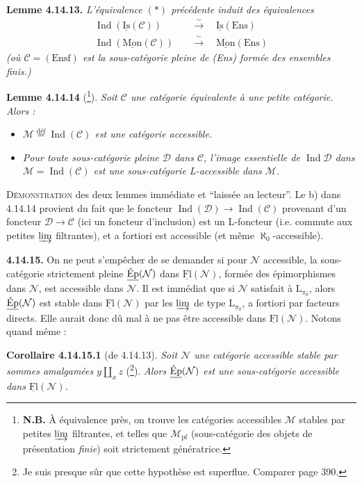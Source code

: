 \documentclass[11pt]{article}
\newcommand{\msp}[1]{\marginpar{\footnotesize [#1]}}
\DeclareMathOperator{\Ind}{Ind}
\newcommand{\defeq}{\overset{\text{déf}}{=}}
\newcommand{\uFl}{\underline{\mathrm{Fl}}}
\newcommand{\uIs}{\underline{\mathrm{Is}}}
\newcommand{\uMon}{\underline{\mathrm{Mon}}}
\newcommand{\uEp}{\underline{\textup{Ép}}}
\newcommand{\Ens}{\mathrm{Ens}}
\begin{document}
\textbf{Lemme 4.14.13.} \textit{L'équivalence $(*)$ précédente induit des équivalences}
\[
\begin{aligned}
\Ind(\uIs(\mathcal{C})) \quad &\xrightarrow{\ \sim\ } \quad \uIs(\Ens) \\
\Ind(\uMon(\mathcal{C})) \quad &\xrightarrow{\ \sim\ } \quad \uMon(\Ens)
\end{aligned}
\]
\textit{(où $\mathcal{C} = (\mathrm{Ensf})$ est la sous-catégorie pleine de \textup{(Ens)} formée des ensembles \textup{finis}.)}

\textbf{Lemme 4.14.14} (\footnote[166]{\textbf{N.B.} À équivalence près, on trouve les catégories accessibles $\mathcal{M}$ stables par petites $\varinjlim$ filtrantes, et telles que $\mathcal{M}_{\mathrm{pf}}$ (sous-catégorie des objets de présentation \textit{finie}) soit strictement génératrice.}). \textit{Soit $\mathcal{C}$ une catégorie équivalente à une petite catégorie. Alors :}
\begin{itemize}[nosep]
\item[\textit{a)}] \textit{$\mathcal{M} \defeq \Ind(\mathcal{C})$ est une catégorie accessible.}
\item[\textit{b)}] \textit{Pour toute sous-catégorie pleine $\mathcal{D}$ dans $\mathcal{C}$, l'image essentielle de $\Ind\mathcal{D}$ dans $\mathcal{M} = \Ind(\mathcal{C})$ est une sous-catégorie L-accessible dans $\mathcal{M}$.}
\end{itemize}
\textsc{Démonstration} des deux lemmes immédiate et ``laissée au lecteur''. Le b) dans 4.14.14 provient du fait que le foncteur $\Ind(\mathcal{D}) \longrightarrow \Ind(\mathcal{C})$ provenant d'un foncteur $\mathcal{D} \longrightarrow \mathcal{C}$ (ici un
\msp{page 387}
foncteur d'inclusion) est un L-foncteur (i.e. commute aux petites $\varinjlim$ filtrantes), et a fortiori est accessible (et même $\aleph_0$-accessible).

\textbf{4.14.15.} On ne peut s'empêcher de se demander si pour $\mathcal{N}$ accessible, la sous-catégorie strictement pleine $\uEp(\mathcal{N})$ dans $\uFl(\mathcal{N})$, formée des épimorphismes dans $\mathcal{N}$, est accessible dans $\mathcal{N}$. Il est immédiat que si $\mathcal{N}$ satisfait à $\mathrm{L}_{\pi_0}$, alors $\uEp(\mathcal{N})$ est stable dans $\uFl(\mathcal{N})$ par les $\varinjlim$ de type $\mathrm{L}_{\pi_0}$, a fortiori par facteurs directs. Elle aurait donc dû mal à ne pas être accessible dans $\uFl(\mathcal{N})$. Notons quand même : %

\textbf{Corollaire 4.14.15.1} (de 4.14.13). \textit{Soit $\mathcal{N}$ une catégorie accessible stable par sommes amalgamées $y \amalg_x z$} (\footnote[167]{Je suis presque sûr que cette hypothèse est superflue. Comparer page 390.}). \textit{Alors $\uEp(\mathcal{N})$ est une sous-catégorie accessible dans $\uFl(\mathcal{N})$.}
\end{document}
